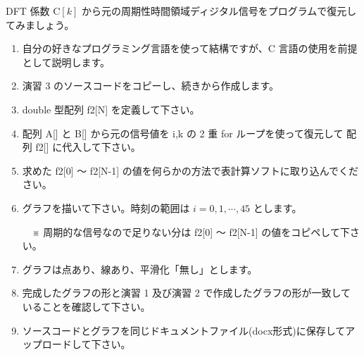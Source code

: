 \documentclass[a4paper]{jarticle}
\begin{document}
 DFT 係数 $\textrm{C}[k]$ から元の周期性時間領域ディジタル信号をプログラムで復元してみましょう。\par
\par\vspace{1zh}
\begin{enumerate}
\item 自分の好きなプログラミング言語を使って結構ですが、C 言語の使用を前提として説明します。
\item 演習 3 のソースコードをコピーし、続きから作成します。
\item double 型配列 f2[N] を定義して下さい。
\item 配列 A[] と B[] から元の信号値を i,k の 2 重 for ループを使って復元して 配列 f2[] に代入して下さい。
\item 求めた f2[0] 〜 f2[N-1] の値を何らかの方法で表計算ソフトに取り込んでください。
\item グラフを描いて下さい。時刻の範囲は $i = 0, 1,  \cdots, 45$ とします。\par
　※ 周期的な信号なので足りない分は f2[0] 〜 f2[N-1] の値をコピペして下さい。
\item グラフは点あり、線あり、平滑化「無し」とします。
\item 完成したグラフの形と演習 1 及び演習 2 で作成したグラフの形が一致していることを確認して下さい。
\item ソースコードとグラフを同じドキュメントファイル(docx形式)に保存してアップロードして下さい。
\end{enumerate}

\end{document}
